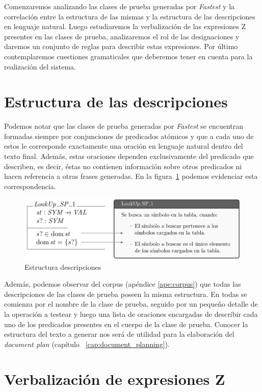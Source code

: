 Comenzaremos analizando las clases de prueba generadas por \emph{Fastest} y la correlación entre la estructura de las mismas y la estructura de las descripciones en lenguaje natural. Luego estudiaremos la verbalización de las expresiones Z presentes en las clases de prueba, analizaremos el rol de las designaciones y daremos un conjunto de reglas para describir estas expresiones. Por último contemplaremos cuestiones gramaticales que deberemos tener en cuenta para la realización del sistema.

\section{Estructura de las descripciones}
\label{sec:corpus_descripciones}
Podemos notar que las clases de prueba generadas por \emph{Fastest} se encuentran formadas siempre por conjunciones de predicados atómicos y que a cada uno de estos le corresponde exactamente una oración en lenguaje natural dentro del texto final. Además, estas oraciones dependen exclusivamente del predicado que describen, es decir, éstas no contienen información sobre otros predicados ni hacen referencia a otras frases generadas. En la figura~\ref{fig:ej_test_desc} podemos evidenciar esta correspondencia.

\begin{figure}[H]
\centering
\includegraphics[scale=0.4]{img/ej_test_desc.png}
\caption{Estructura descripciones}
\label{fig:ej_test_desc}
\end{figure}

Además, podemos observar del corpus (apéndice \ref{ape:corpus}) que todas las descripciones de las clases de prueba poseen la misma estructura. En todas se comienza por el nombre de la clase de prueba, seguido por un pequeño detalle de la operación a testear y luego una lista de oraciones encargadas de describir cada uno de los predicados presentes en el cuerpo de la clase de prueba. Conocer la estructura del texto a generar nos será de utilidad para la elaboración del \emph{document plan} (capítulo ~\ref{cap:document_planning}).

\section{Verbalización de expresiones Z}
\label{sec:corpus_verbalizacion}

